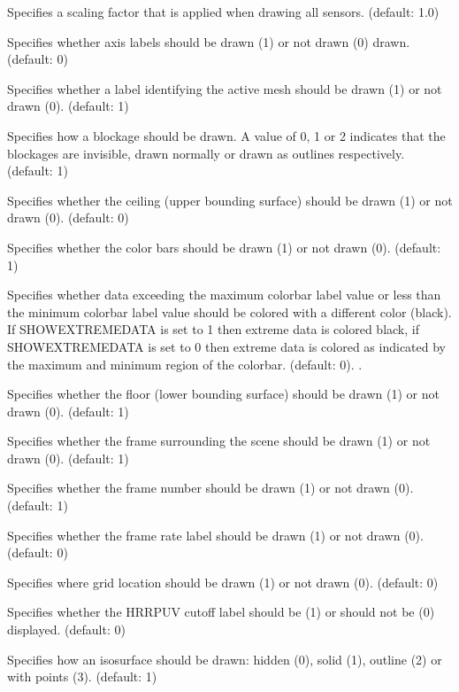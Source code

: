 \documentclass[11pt,twoside]{book}
\newcommand{\hitem}[1]{\item[{\bf #1} \hfill]}
\begin{document}
\hitem{SENSORRELSIZE} Specifies a scaling factor that is applied when drawing all sensors.  (default: 1.0)

\hitem{SHOWAXISLABELS} Specifies whether axis labels should
be drawn (1) or not drawn (0) drawn. (default: 0)

\hitem{SHOWBLOCKLABEL} Specifies whether a label identifying the
active mesh should be drawn (1) or not drawn (0). (default: 1)

\hitem{SHOWBLOCKS}Specifies how a blockage should
be drawn.  A value of 0, 1 or 2 indicates that the blockages are
invisible, drawn normally or drawn as outlines respectively.  (default: 1)

\hitem{SHOWCADANDGRID}

\hitem{SHOWCEILING}Specifies whether
the ceiling (upper bounding surface) should be drawn (1) or not drawn (0).
(default: 0)


\hitem{SHOWCOLORBARS}Specifies whether
the color bars should be drawn (1) or not drawn (0).
(default: 1)

\hitem{SHOWEXTREMEDATA}Specifies whether data exceeding the maximum colorbar label value or less than the minimum colorbar label value should be colored with a different color (black).  If SHOWEXTREMEDATA is set to 1 then extreme data is colored black, if SHOWEXTREMEDATA is set to 0 then extreme data is colored as indicated by the maximum and minimum region of the colorbar. (default: 0).  .

\hitem{SHOWFLOOR}Specifies whether
the floor (lower bounding surface) should be drawn (1) or not drawn
(0).
(default: 1)

\hitem{SHOWFRAME} Specifies whether the frame surrounding
the scene should be drawn (1) or not drawn (0). (default:
1)

\hitem{SHOWFRAMELABEL} Specifies whether the frame number
should be drawn (1) or not drawn (0). (default: 1)

\hitem{SHOWFRAMERATE}Specifies whether
the frame rate label should be drawn (1) or not drawn (0).
(default: 0)

\hitem{SHOWGRIDLOC} Specifies where grid location should be drawn (1) or not drawn (0). (default: 0)

\hitem{SHOWHRRCUTOFF}Specifies whether the HRRPUV cutoff label should be (1) or should not be (0) displayed. (default: 0)

\hitem{SHOWISO}Specifies how an isosurface should be drawn: hidden (0), solid (1), outline (2) or with points (3).  (default: 1)
\end{document}

